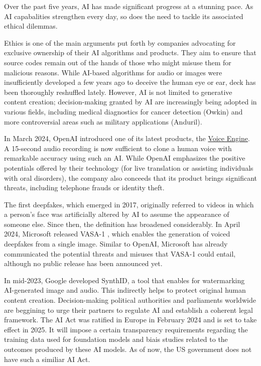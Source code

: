 Over the past five years, \ac{AI} has made significant progress at a stunning pace. As \ac{AI} capabalities strengthen every day, so does the need to tackle its associated ethical dilemmas. 

Ethics is one of the main arguments put forth by companies advocating for exclusive ownership of their \ac{AI} algorithms and products. They aim to ensure that source codes remain out of the hands of those who might misuse them for malicious reasons. While \ac{AI}-based algorithms for audio or images were insufficiently developed a few years ago to deceive the human eye or ear, deck has been thoroughly reshuffled lately. However, \ac{AI} is not limited to generative content creation; decision-making granted by \ac{AI} are increasingly being adopted in various fields, including medical diagnostics for cancer detection (\eg Owkin) and  more controversial areas such as military applications (\eg Anduril).

In March 2024, OpenAI introduced one of its latest products, the \href{https://openai.com/blog/navigating-the-challenges-and-opportunities-of-synthetic-voices}{Voice Engine}. A 15-second audio recording is now sufficient to clone a human voice with remarkable accuracy using such an \ac{AI}. While OpenAI emphasizes the positive potentials offered by their technology (for live translation or assisting individuals with oral disorders), the company also conceeds that its product brings significant threats, including telephone frauds or identity theft. 

The first deepfakes, which emerged in 2017, originally referred to videos in which a person's face was artificially altered by \ac{AI} to assume the appearance of someone else. Since then, the definition has broadened considerably. In April 2024, Microsoft released VASA-1 \citep{xu2024vasa1}, which enables the generation of voiced deepfakes from a single image. Similar to OpenAI, Microsoft has already communicated the potential threats and misuses that VASA-1 could entail, although no public release has been announced yet.

In mid-2023, Google developed SynthID, a tool that enables for watermarking \ac{AI}-generated image and audio. This indirectly helps to protect original human content creation. Decision-making political authorities and parliaments worldwide are beggining to urge their partners to regulate \ac{AI} and establish a coherent legal framework. The AI Act was ratified in Europe in February 2024 and is set to take effect in 2025. It will impose a certain transparency requirements regarding the training data used for foundation models and biais studies related to the outcomes produced by these \ac{AI} models. As of now, the US government does not have such a similiar AI Act. 



